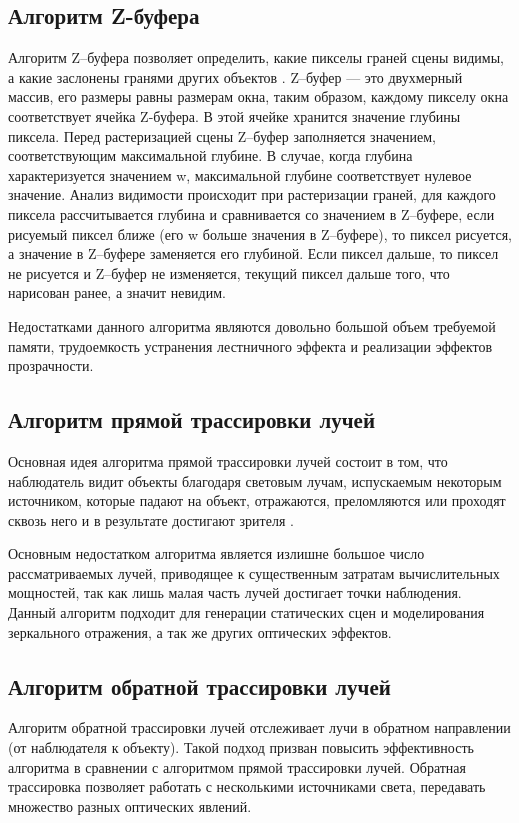 \subsection{Алгоритм Z-буфера}
Алгоритм Z–буфера позволяет определить, какие пикселы граней сцены видимы, а какие заслонены гранями других объектов \cite{zbuffer}. Z–буфер --- это двухмерный массив, его размеры равны размерам окна, таким образом, каждому пикселу окна соответствует ячейка Z-буфера. В этой ячейке хранится
значение глубины пиксела. Перед растеризацией сцены Z–буфер заполняется значением, соответствующим максимальной глубине. В случае, когда глубина характеризуется значением w, максимальной глубине соответствует нулевое значение. Анализ видимости происходит при растеризации граней, для каждого пиксела рассчитывается глубина и сравнивается со значением в Z–буфере, если рисуемый пиксел ближе (его w больше значения в Z–буфере), то пиксел рисуется, а значение в Z–буфере заменяется его глубиной. Если пиксел дальше, то пиксел не рисуется и Z–буфер не изменяется, текущий пиксел дальше того, что нарисован ранее, а значит невидим.

Недостатками данного алгоритма являются довольно большой объем требуемой памяти, трудоемкость устранения лестничного эффекта и реализации эффектов прозрачности.

\subsection{Алгоритм прямой трассировки лучей}

Основная идея алгоритма прямой трассировки лучей состоит в том, что наблюдатель видит объекты благодаря световым лучам, испускаемым некоторым источником, которые падают на объект, отражаются, преломляются или проходят сквозь него и в результате достигают зрителя \cite{ray-tracing}.

Основным недостатком алгоритма является излишне большое число рассматриваемых лучей, приводящее к существенным затратам вычислительных мощностей, так как лишь малая часть лучей достигает точки наблюдения. Данный алгоритм подходит для генерации статических сцен и моделирования зеркального отражения, а так же других оптических эффектов.

\subsection{Алгоритм обратной трассировки лучей}
Алгоритм обратной трассировки лучей отслеживает лучи в обратном
направлении (от наблюдателя к объекту)\cite{ray-tracing}. Такой подход призван повысить
эффективность алгоритма в сравнении с алгоритмом прямой трассировки
лучей. Обратная трассировка позволяет работать с несколькими источниками
света, передавать множество разных оптических явлений.

